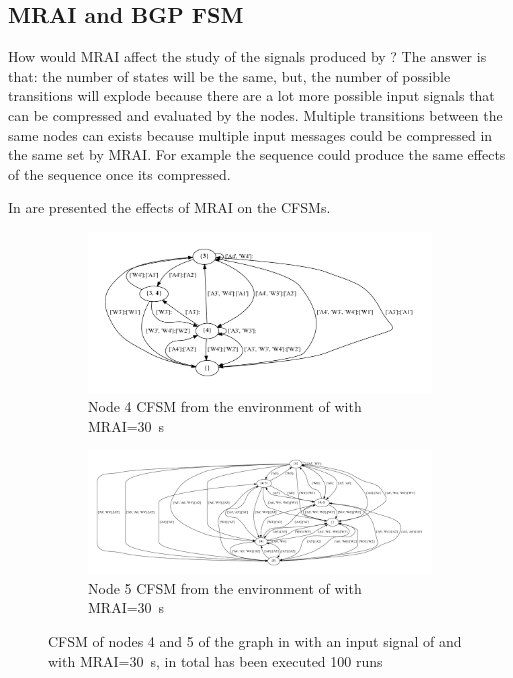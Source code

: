 \subsection{MRAI and BGP FSM}
\label{subsec:mrai_vs_bgpfsm}

How would \ac{MRAI} affect the study of the signals produced by ?
The answer is that: the number of states will be the same, but, the number of possible
transitions will explode because there are a lot more possible
input signals that can be compressed and evaluated by the nodes.
Multiple transitions between the same nodes can exists because multiple input
messages could be compressed in the same set by \ac{MRAI}.
For example the sequence  could produce the same effects of the sequence
 once its compressed.

In  are presented the effects of \ac{MRAI} on the \ac{CFSM}s.

\begin{figure}[h]
     \centering
     \begin{subfigure}[b]{0.7\textwidth}
         \centering
         \includegraphics[width=\textwidth]{images/fsm/fig_4_4_MRAI30.pdf}
		 \caption{Node \num{4} \ac{CFSM} from the environment of  with \ac{MRAI}=\SI{30}{\second}}
         \label{fig:fsm_node4_MRAI}
     \end{subfigure}
     \hfill
     \begin{subfigure}[b]{0.9\textwidth}
         \centering
         \includegraphics[width=\textwidth]{images/fsm/fig_4_5_MRAI30.pdf}
		 \caption{Node \num{5} \ac{CFSM} from the environment of  with \ac{MRAI}=\SI{30}{\second}}
         \label{fig:fsm_node5_MRAI}
     \end{subfigure}
		\caption{\ac{CFSM} of nodes \num{4} and \num{5} of the graph in
			 with an input signal of  and with
			\ac{MRAI}=\SI{30}{\second}, in total has been executed \num{100} runs}
        \label{fig:fsm_griffin_fig4_MRAI}
\end{figure}

